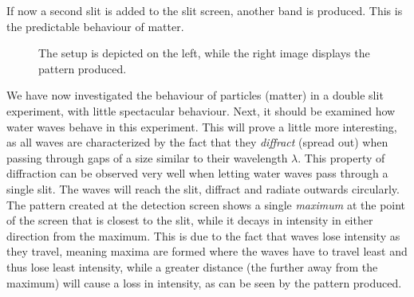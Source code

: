\pagebreak

If now a second slit is added to the slit screen, another band is produced. This is the predictable behaviour of matter.
 
\begin{figure}[h!]
	\centering
	\hspace{1cm}
	\caption*{The setup is depicted on the left, while the right image displays the pattern produced.}
\end{figure}

We have now investigated the behaviour of particles (matter) in a double slit experiment, with little spectacular behaviour. Next, it should be examined how water waves behave in this experiment. This will prove a little more interesting, as all waves are characterized by the fact that they \emph{diffract} (spread out) when passing through gaps of a size similar to their wavelength $\lambda$. This property of diffraction can be observed very well when letting water waves pass through a single slit. The waves will reach the slit, diffract and radiate outwards circularly. The pattern created at the detection screen shows a single \emph{maximum} at the point of the screen that is closest to the slit, while it decays in intensity in either direction from the maximum. This is due to the fact that waves lose intensity as they travel, meaning maxima are formed where the waves have to travel least and thus lose least intensity, while a greater distance (the further away from the maximum) will cause a loss in intensity, as can be seen by the pattern produced.

